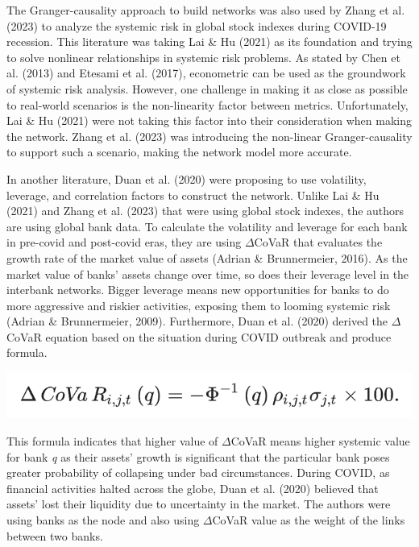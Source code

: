 \documentclass[a4paper,11pt]{article}
\begin{document}
The Granger-causality approach to build networks was also used by Zhang et al. (2023) to analyze the systemic risk in global stock indexes during COVID-19 recession. This literature was taking Lai \& Hu (2021) as its foundation and trying to solve nonlinear relationships in systemic risk problems. As stated by Chen et al. (2013) and Etesami et al. (2017), econometric can be used as the groundwork of systemic risk analysis. However, one challenge in making it as close as possible to real-world scenarios is the non-linearity factor between metrics. Unfortunately, Lai \& Hu (2021) were not taking this factor into their consideration when making the network. Zhang et al. (2023) was introducing the non-linear Granger-causality to support such a scenario, making the network model more accurate. 

In another literature, Duan et al. (2020) were proposing to use volatility, leverage, and correlation factors to construct the network. Unlike Lai \& Hu (2021) and Zhang et al. (2023) that were using global stock indexes, the authors are using global bank data. To calculate the volatility and leverage for each bank in pre-covid and post-covid eras, they are using $\Delta$CoVaR that evaluates the growth rate of the market value of assets (Adrian \& Brunnermeier, 2016). As the market value of banks’ assets change over time, so does their leverage level in the interbank networks. Bigger leverage means new opportunities for banks to do more aggressive and riskier activities, exposing them to looming systemic risk (Adrian \& Brunnermeier, 2009). Furthermore, Duan et al. (2020) derived the $\Delta$CoVaR equation based on the situation during COVID outbreak and produce formula.

\includegraphics[scale=0.7]{covar.png}

This formula indicates that higher value of $\Delta$CoVaR means higher systemic value for bank \textit{q} as their assets’ growth is significant that the particular bank poses greater probability of collapsing under bad circumstances. During COVID, as financial activities halted across the globe, Duan et al. (2020) believed that assets’ lost their liquidity due to uncertainty in the market. The authors were using banks as the node and also using $\Delta$CoVaR value as the weight of the links between two banks.
\end{document}
